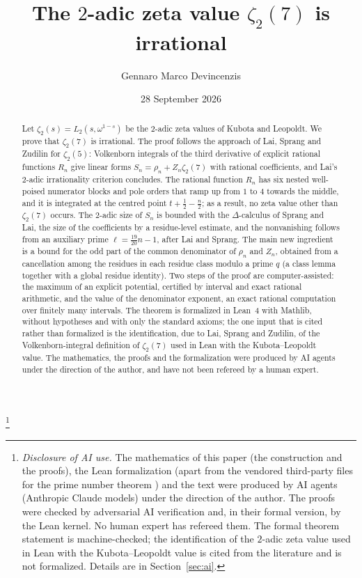 \documentclass{amsart}
\theoremstyle{definition}
\theoremstyle{remark}
\numberwithin{equation}{section}
\begin{document}
\title[The $2$-adic zeta value $\zeta_2(7)$ is irrational]{The $2$-adic zeta
value $\zeta_2(7)$ is irrational}

\author{Gennaro Marco Devincenzis}

\thanks{\emph{Disclosure of AI use.} The mathematics of this paper (the
construction and the proofs), the Lean formalization (apart from the
vendored third-party files for the prime number theorem \cite{PNTLean}) and
the text were produced by AI agents (Anthropic Claude models) under the
direction of the author. The proofs were checked by adversarial AI
verification and, in their formal version, by the Lean kernel. No human expert
has refereed them. The formal theorem statement is machine-checked; the
identification of the $2$-adic zeta value used in Lean with the
Kubota--Leopoldt value is cited from the literature and is not formalized.
Details are in Section~\ref{sec:ai}.}

\date{28 September 2026}



\begin{abstract}
Let $\zeta_2(s)=L_2(s,\omega^{1-s})$ be the $2$-adic zeta values of Kubota and
Leopoldt. We prove that $\zeta_2(7)$ is irrational. The proof follows the
approach of Lai, Sprang and Zudilin for $\zeta_2(5)$: Volkenborn integrals of
the third derivative of explicit rational functions $R_n$ give linear forms
$S_n=\rho_n+Z_n\zeta_2(7)$ with rational coefficients, and Lai's $2$-adic
irrationality criterion concludes. The rational function $R_n$ has six nested
well-poised numerator blocks and pole orders that ramp up from $1$ to $4$
towards the middle, and it is integrated at the centred point
$t+\frac12-\frac n2$; as a result, no zeta value other than $\zeta_2(7)$
occurs. The $2$-adic size of $S_n$ is bounded with the $\Delta$-calculus of
Sprang and Lai, the size of the coefficients by a residue-level estimate, and
the nonvanishing follows from an auxiliary prime $\ell=\frac{19}{20}n-1$, after
Lai and Sprang. The main new ingredient is a bound for the odd part of the
common denominator of $\rho_n$ and $Z_n$, obtained from a cancellation among
the residues in each residue class modulo a prime $q$ (a class lemma together
with a global residue identity). Two steps of the proof are computer-assisted:
the maximum of an explicit potential, certified by interval and exact
rational arithmetic, and the value of the denominator exponent, an exact
rational computation over finitely many intervals. The theorem is formalized
in Lean~4 with Mathlib, without hypotheses and with only the standard axioms;
the one input that is cited rather than formalized is the identification, due
to Lai, Sprang and Zudilin, of the Volkenborn-integral definition of
$\zeta_2(7)$ used in Lean with the Kubota--Leopoldt value. The mathematics,
the proofs and the formalization were produced by AI agents under the
direction of the author, and have not been refereed by a human expert.
\end{abstract}
\end{document}

